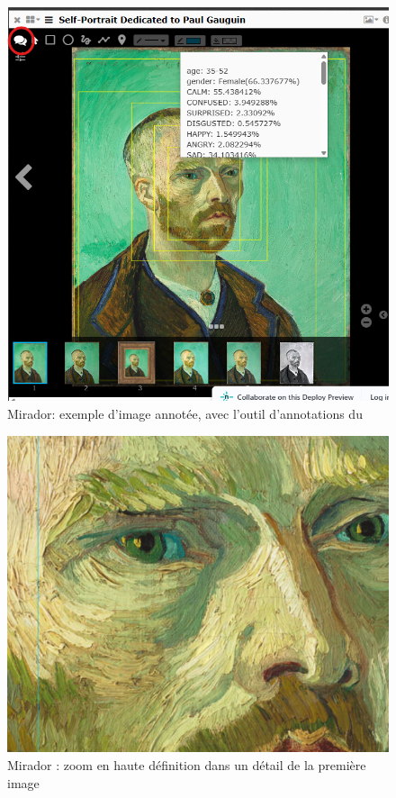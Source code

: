         \begin{figure}[h!]
            \centering
            \includegraphics[width=12cm]{02_images/part_01/12_mirador_02.png}
            \caption{Mirador: exemple d'image annotée, avec l'outil d'annotations du }
        \end{figure}

        \begin{figure}[h!]
            \centering
            \includegraphics[width=12cm]{02_images/part_01/13_mirador_03.png}
            \caption{Mirador : zoom en haute définition dans un détail de la première image}
        \end{figure}
    
